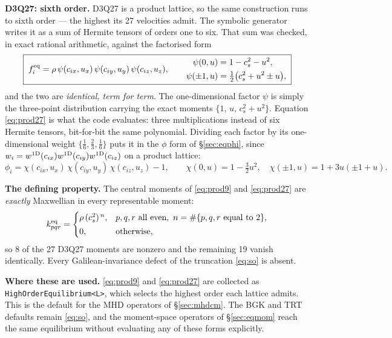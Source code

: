 \documentclass[11pt,a4paper]{article}
\newcommand{\code}[1]{\texttt{\small #1}}
\newcommand{\cs}{c_s}
\begin{document}
\medskip
\noindent\textbf{D3Q27: sixth order.} D3Q27 is a product lattice, so the same
construction runs to sixth order --- the highest its 27 velocities admit. The
symbolic generator writes it as a sum of Hermite tensors of orders one to six.
That sum was checked, in exact rational arithmetic, against the factorised form
\begin{equation}
  \boxed{\;
  f_i^{\rm eq} = \rho\,\psi(c_{ix},u_x)\,\psi(c_{iy},u_y)\,\psi(c_{iz},u_z),
  \qquad
  \begin{aligned}
    \psi(0,u)     &= 1-\cs^2-u^2, \\
    \psi(\pm1,u)  &= \tfrac12\big(\cs^2+u^2\pm u\big),
  \end{aligned}\;}
  \label{eq:prod27}
\end{equation}
and the two are \emph{identical, term for term}. The one-dimensional factor
$\psi$ is simply the three-point distribution carrying the exact moments
$\{1,\,u,\,\cs^2+u^2\}$. Equation \eqref{eq:prod27} is what the code evaluates:
three multiplications instead of six Hermite tensors, bit-for-bit the same
polynomial. Dividing each factor by its one-dimensional weight
$\{\tfrac16,\tfrac23,\tfrac16\}$ puts it in the $\phi$ form of \S\ref{sec:eqphi},
since $w_i = w^{\rm 1D}(c_{ix})w^{\rm 1D}(c_{iy})w^{\rm 1D}(c_{iz})$ on a product
lattice:
\begin{equation}
  \phi_i = \chi(c_{ix},u_x)\,\chi(c_{iy},u_y)\,\chi(c_{iz},u_z) - 1,
  \qquad
  \chi(0,u) = 1-\tfrac32u^2,\quad \chi(\pm1,u) = 1+3u(\pm1+u).
  \label{eq:chi27}
\end{equation}

\medskip
\noindent\textbf{The defining property.} The central moments of
\eqref{eq:prod9} and \eqref{eq:prod27} are \emph{exactly} Maxwellian in every
representable moment:
\begin{equation}
  k_{pqr}^{\rm eq} =
  \begin{cases}
    \rho\,(\cs^2)^{\,n}, & p,q,r \text{ all even},\ n = \#\{p,q,r\ \text{equal to } 2\}, \\[2pt]
    0, & \text{otherwise},
  \end{cases}
  \label{eq:maxcm}
\end{equation}
so 8 of the 27 D3Q27 moments are nonzero and the remaining 19 vanish identically.
Every Galilean-invariance defect of the truncation \eqref{eq:so} is absent.

\noindent\textbf{Where these are used.} \eqref{eq:prod9} and \eqref{eq:prod27}
are collected as \code{HighOrderEquilibrium<L>}, which selects the highest order
each lattice admits. This is the default for the MHD operators
of \S\ref{sec:mhdcm}. The BGK and TRT defaults remain \eqref{eq:so}, and the
moment-space operators of \S\ref{sec:eqmom} reach the same equilibrium without
evaluating any of these forms explicitly.
\end{document}
